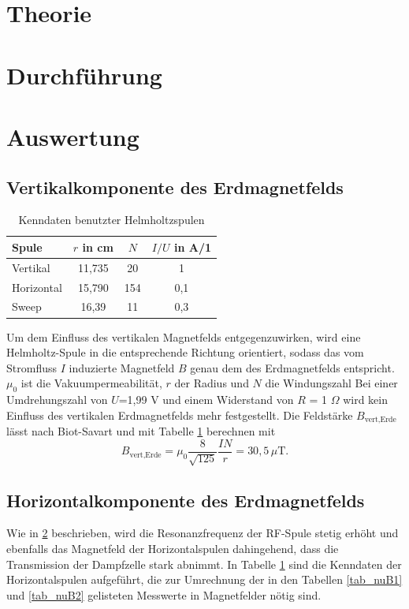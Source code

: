 

\section{Theorie}
\setcounter{page}{1}

\section{Durchführung}
\label{sec_durch}

\section{Auswertung}
\subsection{Vertikalkomponente des Erdmagnetfelds}
\begin{table}[H]
 \begin{tabular}{l|c|c|c}
  Spule & $r$ in cm & $N$ & $I/U$ in A/1\\
  \hline
  Vertikal & 11,735 & 20 & 1\\
  Horizontal & 15,790 & 154 & 0,1\\
  Sweep & 16,39 & 11 & 0,3
 \end{tabular}
\caption{Kenndaten benutzter Helmholtzspulen}
\label{tab_SpulenHor}
\end{table}
Um dem Einfluss des vertikalen Magnetfelds entgegenzuwirken, wird eine Helmholtz-Spule in die entsprechende Richtung orientiert, sodass das vom 
Stromfluss $I$ induzierte Magnetfeld $B$ genau dem des Erdmagnetfelds entspricht. $\mu_0$ ist die Vakuumpermeabilität, $r$ der Radius und $N$ die Windungszahl
Bei einer Umdrehungszahl von $U$=1,99 V und einem Widerstand von $R$ = 1 $\Omega$ wird kein Einfluss des vertikalen Erdmagnetfelds mehr festgestellt. 
Die Feldstärke $B_{\text{vert,Erde}}$ lässt nach Biot-Savart und mit Tabelle \ref{tab_SpulenHor} berechnen mit
\begin{equation}
 B_{\text{vert,Erde}} = \mu_0 \frac{8}{\sqrt{125}}\frac{I N}{r} = 30,5 \, \mu\text{T}.
\end{equation}
\subsection{Horizontalkomponente des Erdmagnetfelds}
Wie in \ref{sec_durch} beschrieben, wird die Resonanzfrequenz der RF-Spule stetig erhöht und ebenfalls das Magnetfeld der Horizontalspulen dahingehend,
dass die Transmission der Dampfzelle stark abnimmt. In Tabelle \ref{tab_SpulenHor} sind die Kenndaten der Horizontalspulen aufgeführt, die zur Umrechnung
der in den Tabellen \ref{tab_nuB1} und \ref{tab_nuB2} gelisteten Messwerte in Magnetfelder nötig sind.


